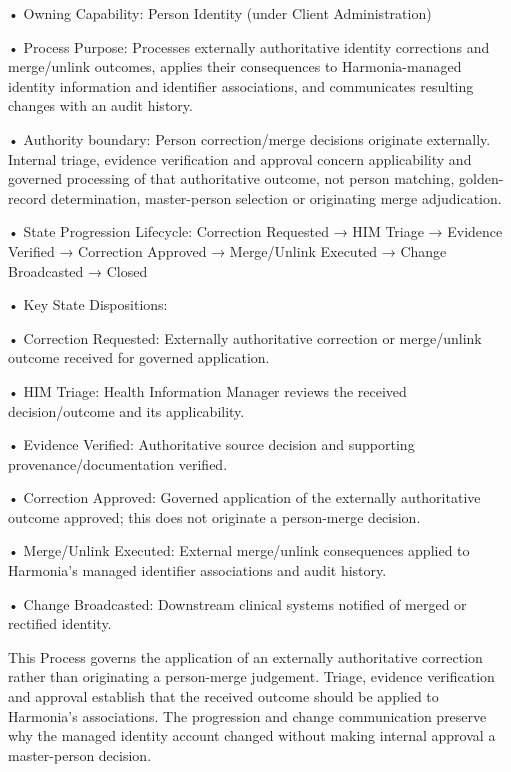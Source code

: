 •
Owning Capability: Person Identity (under Client Administration)



•
Process Purpose: Processes externally authoritative identity corrections and merge/unlink outcomes, applies their consequences to Harmonia-managed identity information and identifier associations, and communicates resulting changes with an audit history.



•
Authority boundary: Person correction/merge decisions originate externally. Internal triage, evidence verification and approval concern applicability and governed processing of that authoritative outcome, not person matching, golden-record determination, master-person selection or originating merge adjudication.



•
State Progression Lifecycle: Correction Requested → HIM Triage → Evidence Verified → Correction Approved → Merge/Unlink Executed → Change Broadcasted → Closed



•
Key State Dispositions:



•
Correction Requested: Externally authoritative correction or merge/unlink outcome received for governed application.



•
HIM Triage: Health Information Manager reviews the received decision/outcome and its applicability.



•
Evidence Verified: Authoritative source decision and supporting provenance/documentation verified.



•
Correction Approved: Governed application of the externally authoritative outcome approved; this does not originate a person-merge decision.



•
Merge/Unlink Executed: External merge/unlink consequences applied to Harmonia's managed identifier associations and audit history.



•
Change Broadcasted: Downstream clinical systems notified of merged or rectified identity.



This Process governs the application of an externally authoritative correction rather than originating a person-merge judgement. Triage, evidence verification and approval establish that the received outcome should be applied to Harmonia's associations. The progression and change communication preserve why the managed identity account changed without making internal approval a master-person decision.



